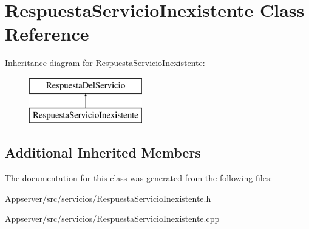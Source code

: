 \hypertarget{classRespuestaServicioInexistente}{}\section{Respuesta\+Servicio\+Inexistente Class Reference}
\label{classRespuestaServicioInexistente}
Inheritance diagram for Respuesta\+Servicio\+Inexistente\+:\begin{figure}[H]
\begin{center}
\leavevmode
\includegraphics[height=2.000000cm]{classRespuestaServicioInexistente}
\end{center}
\end{figure}
\subsection*{Additional Inherited Members}


The documentation for this class was generated from the following files\+:\begin{DoxyCompactItemize}
\item 
Appserver/src/servicios/Respuesta\+Servicio\+Inexistente.\+h\item 
Appserver/src/servicios/Respuesta\+Servicio\+Inexistente.\+cpp\end{DoxyCompactItemize}
